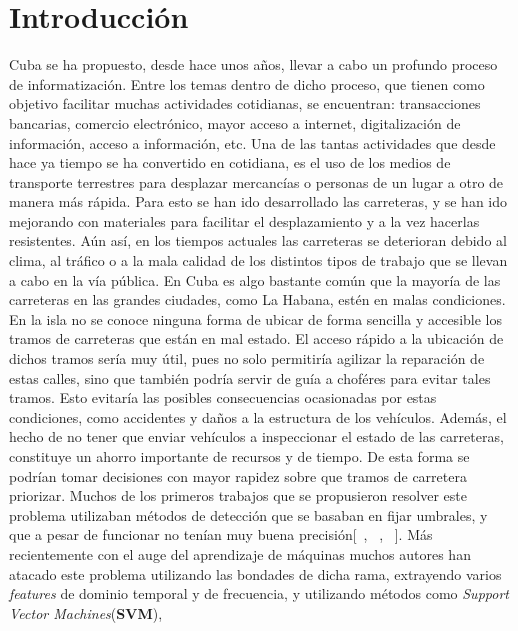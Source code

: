 \chapter*{Introducción}\label{chapter:introduction}

Cuba se ha propuesto, desde hace unos años, llevar a cabo un profundo proceso de informatización.
Entre los temas dentro de dicho proceso, que tienen como objetivo facilitar muchas actividades
cotidianas, se encuentran: transacciones bancarias, comercio electrónico, mayor acceso a internet, digitalización
de información, acceso a información, etc. Una de las tantas actividades que desde hace ya tiempo se ha convertido en
cotidiana, es el uso de los medios de transporte terrestres para desplazar mercancías o personas de un lugar a otro de
manera más rápida. Para esto se han ido desarrollado las carreteras, y se han ido mejorando con materiales para facilitar
el desplazamiento y a la vez hacerlas resistentes. Aún así, en los tiempos actuales las carreteras se deterioran
debido al clima, al tráfico o a la mala calidad de los distintos tipos de trabajo que se llevan a cabo en la vía
pública. En Cuba es algo bastante común que la mayoría de las carreteras en las grandes ciudades, como La Habana,
estén en malas condiciones.\\
\indent En la isla no se conoce ninguna forma de ubicar de forma sencilla y accesible los tramos de carreteras que están en
mal estado. El acceso rápido a la ubicación de dichos tramos sería muy útil, pues no solo permitiría agilizar la reparación de
estas calles, sino que también podría servir de guía a choféres para evitar tales tramos. Esto evitaría las posibles consecuencias
ocasionadas por estas condiciones, como accidentes y daños a la estructura de los vehículos. Además, el hecho de no tener que enviar
vehículos a inspeccionar el estado de las carreteras, constituye un ahorro importante de recursos y de tiempo. De esta forma se podrían
tomar decisiones con mayor rapidez sobre que tramos de carretera priorizar. Muchos de los primeros trabajos que se propusieron resolver
este problema utilizaban métodos de detección que se basaban en fijar umbrales, y que a pesar de funcionar no tenían muy buena
precisión[~, ~, ~]. Más recientemente con
el auge del aprendizaje de máquinas muchos autores han atacado este problema utilizando las bondades de dicha rama, extrayendo
varios \emph{features} de dominio temporal y de frecuencia, y utilizando métodos como \emph{Support Vector Machines}(\textbf{SVM}),

